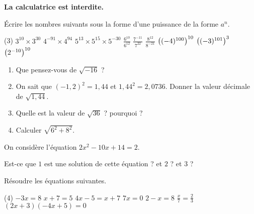 %
\begin{center}
\bfseries\Large
La calculatrice est interdite.
\end{center}

\begin{exr}
\'Ecrire les nombres suivants sous la forme d'une puissance de la forme $a^n$.
\begin{tasks}[label=\alph*.](3)
\task $3^{10}\times3^{30}$
\task $4^{-91}\times4^{94}$
\task $5^{13}\times5^{15}\times5^{-30}$
\task $\frac{6^{10}}{6^{12}}$
\task $\frac{7^{-11}}{7^{22}}$
\task $\frac{8^{12}}{8^{-21}}$
\task $\mleft((-4)^{100}\mright)^{10}$
\task $\mleft((-3)^{101}\mright)^{3}$
\task $\mleft(2^{-10}\mright)^{10}$
\end{tasks}
\end{exr}

\begin{exr}
\begin{enumerate}
\item Que pensez-vous de $\sqrt{-16}$ ?
\item On sait que $(-1,2)^2=1,44$ et $1,44^2=2,0736$. Donner la valeur décimale de $\sqrt{1,44}$.
\item Quelle est la valeur de $\sqrt{36}$ ? pourquoi ?
\item Calculer $\sqrt{6^2+8^2}$.
\end{enumerate}
\end{exr}

\begin{exr}
On considère l'équation $2x^2-10x+14=2$.

Est-ce que $1$ est une solution de cette équation ? et $2$ ? et $3$ ?
\end{exr}

\begin{exr}
Résoudre les équations suivantes.
\begin{tasks}(4)
\task $-3x=8$
\task $x+7=5$
\task $4x-5=x+7$
\task $7x=0$
\task $2-x=8$
\task $\frac{x}{7}=\frac23$
\task $(2x+3)(-4x+5)=0$
\end{tasks}
\end{exr}

